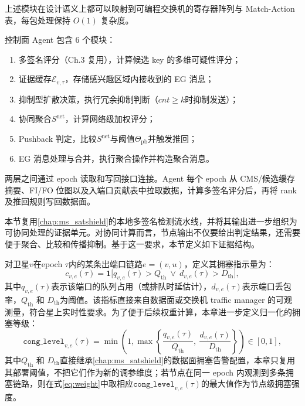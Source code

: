 上述模块在设计语义上都可以映射到可编程交换机的寄存器阵列与 Match-Action 表，每包处理保持 $O(1)$ 复杂度。

控制面 Agent 包含 6 个模块：
\begin{enumerate}
\item 多签名评分（Ch.3 复用），计算候选 key 的多维可疑性评分；
\item 证据缓存$\mathcal{E}_{v,\tau}$，存储感兴趣区域内接收到的 EG 消息；
\item 抑制型扩散决策，执行冗余抑制判断（$cnt \ge k$时抑制发送）；
\item 协同聚合$S^{\text{net}}$，计算网络级加权评分；
\item Pushback 判定，比较$S^{\text{net}}$与阈值$\Theta_{\text{pb}}$并触发推回；
\item EG 消息处理与合并，执行聚合操作并构造聚合消息。
\end{enumerate}

两层之间通过 epoch 读取和写回接口连接。Agent 每个 epoch 从 CMS/候选缓存摘要、FI/FO 位图以及入端口贡献表中拉取数据，计算多签名评分后，再将 rank 及推回规则写回数据面。

本节复用\ref{chap:ms_satshield}的本地多签名检测流水线，并将其输出进一步组织为可协同处理的证据单元。对协同计算而言，节点输出不仅要给出判定结果，还需要便于聚合、比较和传播抑制。基于这一要求，本节定义如下证据结构。

对卫星$v$在epoch $\tau$内的某条出端口链路$e=(v,u)$，定义其拥塞指示量为：
\begin{equation}
c_{v,e}(\tau) = \mathbf{1}\big[q_{v,e}(\tau) > Q_{\text{th}} \ \vee \ d_{v,e}(\tau) > D_{\text{th}}\big],
\label{eq:cong_indicator}
\end{equation}
其中$q_{v,e}(\tau)$表示该端口的队列占用（或排队时延估计），$d_{v,e}(\tau)$表示端口丢包率，$Q_{\text{th}}$ 和 $D_{\text{th}}$为阈值。该指标直接来自数据面或交换机 traffic manager 的可观测量，符合星上实时性要求。为了便于后续权重计算，本章进一步定义归一化的拥塞等级：
\begin{equation}
\texttt{cong\_level}_{v,e}(\tau)=\min\!\left(1,\max\!\left\{\frac{q_{v,e}(\tau)}{Q_{\text{th}}},\ \frac{d_{v,e}(\tau)}{D_{\text{th}}}\right\}\right)\in[0,1],
\label{eq:cong_level}
\end{equation}
其中$Q_{\text{th}}$ 和 $D_{\text{th}}$直接继承\ref{chap:ms_satshield}的数据面拥塞告警配置，本章只复用其部署阈值，不把它们作为新的调参维度；若节点在同一 epoch 内观测到多条拥塞链路，则在式\eqref{eq:weight}中取相应$\texttt{cong\_level}_{v,e}(\tau)$的最大值作为节点级拥塞强度。

